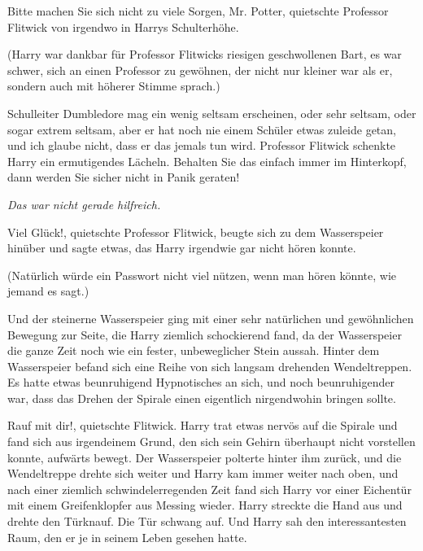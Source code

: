 \glqq Bitte machen Sie sich nicht zu viele Sorgen, Mr. Potter\grqq{}, quietschte
Professor Flitwick von irgendwo in Harrys Schulterhöhe.

(Harry war dankbar für Professor Flitwicks riesigen geschwollenen Bart, es war
schwer, sich an einen Professor zu gewöhnen, der nicht nur kleiner war als er,
sondern auch mit höherer Stimme sprach.)

\glqq Schulleiter Dumbledore mag ein wenig seltsam erscheinen, oder sehr
seltsam, oder sogar extrem seltsam, aber er hat noch nie einem Schüler etwas
zuleide getan, und ich glaube nicht, dass er das jemals tun wird.\grqq{}
Professor Flitwick schenkte Harry ein ermutigendes Lächeln. \glqq Behalten Sie
das einfach immer im Hinterkopf, dann werden Sie sicher nicht in Panik
geraten!\grqq{}

\emph{Das war nicht gerade hilfreich.}

\glqq Viel Glück!\grqq{}, quietschte Professor Flitwick, beugte sich zu dem
Wasserspeier hinüber und sagte etwas, das Harry irgendwie gar nicht hören
konnte.

(Natürlich würde ein Passwort nicht viel nützen, wenn man hören könnte, wie
jemand es sagt.)

Und der steinerne Wasserspeier ging mit einer sehr natürlichen und gewöhnlichen
Bewegung zur Seite, die Harry ziemlich schockierend fand, da der Wasserspeier
die ganze Zeit noch wie ein fester, unbeweglicher Stein aussah. Hinter dem
Wasserspeier befand sich eine Reihe von sich langsam drehenden Wendeltreppen. Es
hatte etwas beunruhigend Hypnotisches an sich, und noch beunruhigender war, dass
das Drehen der Spirale einen eigentlich nirgendwohin bringen sollte.

\glqq Rauf mit dir!\grqq{}, quietschte Flitwick. Harry trat etwas nervös auf die
Spirale und fand sich aus irgendeinem Grund, den sich sein Gehirn überhaupt
nicht vorstellen konnte, aufwärts bewegt. Der Wasserspeier polterte hinter ihm
zurück, und die Wendeltreppe drehte sich weiter und Harry kam immer weiter nach
oben, und nach einer ziemlich schwindelerregenden Zeit fand sich Harry vor einer
Eichentür mit einem Greifenklopfer aus Messing wieder. Harry streckte die Hand
aus und drehte den Türknauf. Die Tür schwang auf. Und Harry sah den
interessantesten Raum, den er je in seinem Leben gesehen hatte.

